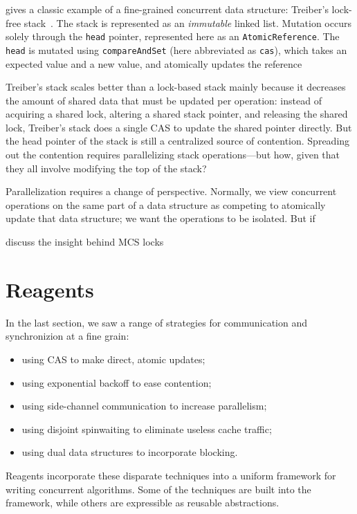 \documentclass[preprint]{sigplanconf}
\begin{document}
 gives a classic example of a fine-grained
concurrent data structure: Treiber's lock-free stack~\cite{?}.  The
stack is represented as an \emph{immutable} linked list.  Mutation
occurs solely through the \lstinline{head} pointer, represented here
as an \lstinline{AtomicReference}.  The \lstinline{head} is mutated
using \lstinline{compareAndSet} (here abbreviated as \lstinline{cas}),
which takes an expected value and a new value, and atomically updates
the reference




Treiber's stack scales better than a lock-based stack mainly because
it decreases the amount of shared data that must be updated per
operation: instead of acquiring a shared lock, altering a shared stack
pointer, and releasing the shared lock, Treiber's stack does a single
CAS to update the shared pointer directly.  But the head pointer of
the stack is still a centralized source of contention.  Spreading out
the contention requires parallelizing stack operations---but how,
given that they all involve modifying the top of the stack?

Parallelization requires a change of perspective.  Normally, we view
concurrent operations on the same part of a data structure as
competing to atomically update that data structure; we want the
operations to be isolated.  But if 


discuss the insight behind MCS locks

\section{Reagents}
\label{sec:reagents}

In the last section, we saw a range of strategies for communication
and synchronizion at a fine grain:
\begin{itemize}
\item using CAS to make direct, atomic updates;
\item using exponential backoff to ease contention; 
\item using side-channel communication to increase parallelism; 
\item using disjoint spinwaiting to eliminate useless cache traffic; 
\item using dual data structures to incorporate blocking.
\end{itemize}
Reagents incorporate these disparate techniques into a uniform framework for
writing concurrent algorithms.  Some of the techniques are built into the
framework, while others are expressible as reusable abstractions.
\end{document}
